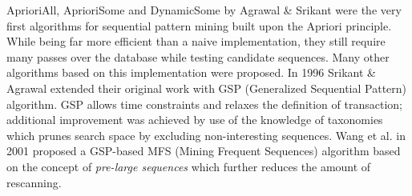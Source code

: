 AprioriAll, AprioriSome and DynamicSome by Agrawal \& Srikant were the very first algorithms for sequential pattern mining built upon the Apriori principle. While being far more efficient than a naive implementation, they still require many passes over the database while testing candidate sequences. Many other algorithms based on this implementation were proposed. In 1996 Srikant \& Agrawal extended their original work with GSP (Generalized Sequential Pattern) algorithm. GSP allows time constraints and relaxes the definition of transaction; additional improvement was achieved by use of the knowledge of taxonomies which prunes search space by excluding non-interesting sequences. Wang et al. in 2001 proposed a GSP-based MFS (Mining Frequent Sequences) \cite{citeulike:5164952} algorithm based on the concept of \textit{pre-large sequences} which further reduces the amount of rescanning.